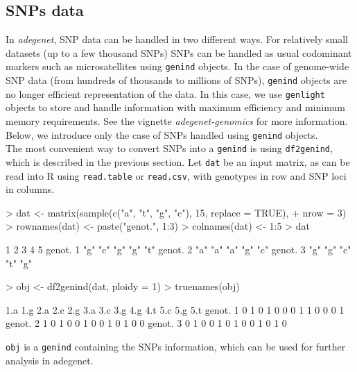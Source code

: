 \documentclass{article}
\begin{document}
\subsection{SNPs data}
In \textit{adegenet}, SNP data can be handled in two different ways.
For relatively small datasets (up to a few thousand SNPs) SNPs can
be handled as usual codominant markers such as microsatellites using \texttt{genind} objects.
In the case of genome-wide SNP data (from hundreds of thousands to millions of SNPs),
\texttt{genind} objects are no longer efficient representation of the data.
In this case, we use \texttt{genlight} objects to store and handle information with maximum
efficiency and minimum memory requirements. See the vignette \textit{adegenet-genomics} for more information.
Below, we introduce only the case of SNPs handled using \texttt{genind} objects.
\\

The most convenient way to convert SNPs into a \texttt{genind} is using \texttt{df2genind}, which is
described in the previous section.
Let \texttt{dat} be an input matrix, as can be read into R using \texttt{read.table} or \texttt{read.csv},
with genotypes in row and SNP loci in columns.
\begin{Schunk}
\begin{Sinput}
> dat <- matrix(sample(c("a", "t", "g", "c"), 15, replace = TRUE), 
+     nrow = 3)
> rownames(dat) <- paste("genot.", 1:3)
> colnames(dat) <- 1:5
> dat
\end{Sinput}
\begin{Soutput}
         1   2   3   4   5  
genot. 1 "g" "c" "g" "g" "t"
genot. 2 "a" "a" "a" "g" "c"
genot. 3 "g" "g" "c" "t" "g"
\end{Soutput}
\begin{Sinput}
> obj <- df2genind(dat, ploidy = 1)
> truenames(obj)
\end{Sinput}
\begin{Soutput}
         1.a 1.g 2.a 2.c 2.g 3.a 3.c 3.g 4.g 4.t 5.c 5.g 5.t
genot. 1   0   1   0   1   0   0   0   1   1   0   0   0   1
genot. 2   1   0   1   0   0   1   0   0   1   0   1   0   0
genot. 3   0   1   0   0   1   0   1   0   0   1   0   1   0
\end{Soutput}
\end{Schunk}

\texttt{obj} is a \texttt{genind} containing the SNPs information, which can be used for further
analysis in adegenet.
\end{document}

